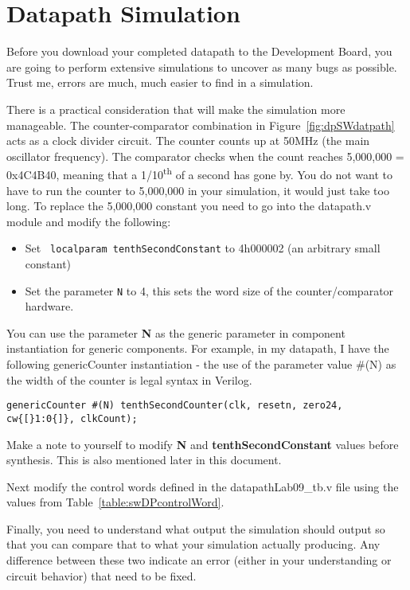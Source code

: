 \section{Datapath Simulation}

Before you download your completed datapath to the Development Board,
you are going to perform extensive simulations to uncover as many bugs
as possible. Trust me, errors are much, much easier to find in a
simulation.

There is a practical consideration that will make the simulation more
manageable. The counter-comparator combination in Figure~\ref{fig:dpSWdatpath} acts as a
clock divider circuit. The counter counts up at 50MHz (the main
oscillator frequency). The comparator checks when the count reaches
5,000,000 = 0x4C4B40, meaning that a 1/10\textsuperscript{th} of a
second has gone by. You do not want to have to run the counter to
5,000,000 in your simulation, it would just take too long. To replace
the 5,000,000 constant you need to go into the datapath.v module and
modify the following:

\begin{itemize}
\item
Set \verb+ localparam tenthSecondConstant+ to 4\textquotesingle h000002
  (an arbitrary small constant)
\item
  Set the parameter \verb+N+ to 4, this sets the word size of the counter/comparator hardware.
\end{itemize}

You can use the parameter \textbf{N} as the generic parameter in
component instantiation for generic components. For example, in my
datapath, I have the following genericCounter instantiation - the use of
the parameter value \#(N) as the width of the counter is legal syntax in
Verilog.

\begin{verbatim}
genericCounter #(N) tenthSecondCounter(clk, resetn, zero24, cw{[}1:0{]}, clkCount);
\end{verbatim}

Make a note to yourself to modify \textbf{N} and
\textbf{tenthSecondConstant} values before synthesis. This is also
mentioned later in this document.

Next modify the control words defined in the datapathLab09\_tb.v file
using the values from Table~\ref{table:swDPcontrolWord}.

Finally, you need to understand what output the simulation should output
so that you can compare that to what your simulation actually producing.
Any difference between these two indicate an error (either in your
understanding or circuit behavior) that need to be fixed.

